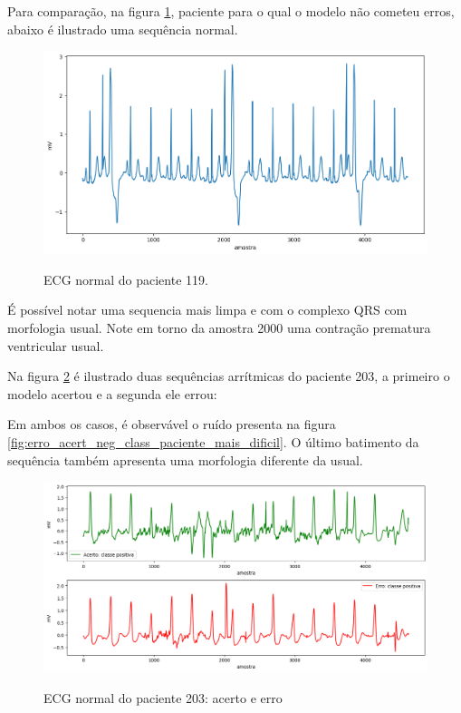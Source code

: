 Para comparação, na figura \ref{fig:acert_neg_class_paciente_mais_facil}, paciente para o qual o modelo não cometeu erros,
abaixo é ilustrado uma sequência normal.

\begin{figure}[H]
  \centering
  \caption{ECG normal do paciente 119.}
   \includegraphics[width=1.0\textwidth]{figuras/analise_erros/ecg_sequencia_normal_neg_paciente_mais_facil.png} 
  \label{fig:acert_neg_class_paciente_mais_facil}
\end{figure}

É possível notar uma sequencia mais limpa e com o complexo QRS com morfologia usual. Note em torno da amostra
2000 uma contração prematura ventricular usual.

Na figura \ref{fig:erro_acert_pos_class_paciente_mais_dificil} é ilustrado duas sequências arrítmicas do paciente 203, a primeiro o modelo acertou e a segunda ele errou:

Em ambos os casos, é observável o ruído presenta na figura \ref{fig:erro_acert_neg_class_paciente_mais_dificil}. O 
último batimento da sequência também apresenta uma morfologia diferente da usual.

\begin{figure}[H]
  \centering
  \caption{ECG normal do paciente 203: acerto e erro}
   \includegraphics[width=1.0\textwidth]{figuras/analise_erros/ecg_erro_acerto_pos_paciente_mais_dificil.png} 
  \label{fig:erro_acert_pos_class_paciente_mais_dificil}
\end{figure}

